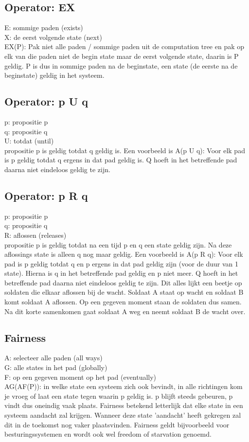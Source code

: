\documentclass{article}
\begin{document}
\subsection{Operator: EX}
E: sommige paden (exists)\\
X: de eerst volgende state (next)\\
EX(P): Pak niet alle paden / sommige paden uit de computation tree en pak op elk van die paden niet de begin state maar de eerst volgende state, daarin is P geldig. P is dus in sommige paden na de beginstate, een state (de eerste na de beginstate) geldig in het systeem.

\subsection{Operator: p U q}
p: propositie p\\
q: propositie q\\
U: totdat (until)\\
propositie p is geldig totdat q geldig is. Een voorbeeld is A(p U q): Voor elk pad is p geldig totdat q ergens in dat pad geldig is. Q hoeft in het betreffende pad daarna niet eindeloos geldig te zijn.

\subsection{Operator: p R q}
p: propositie p\\
q: propositie q\\
R: aflossen (releases)\\
propositie p is geldig totdat na een tijd p en q een state geldig zijn. Na deze aflossings state is alleen q nog maar geldig. Een voorbeeld is A(p R q): Voor elk pad is p geldig totdat q en p ergens in dat pad geldig zijn (voor de duur van 1 state). Hierna is q in het betreffende pad geldig en p niet meer. Q hoeft in het betreffende pad daarna niet eindeloos geldig te zijn. Dit alles lijkt een beetje op soldaten die elkaar aflossen bij de wacht. Soldaat A staat op wacht en soldaat B komt soldaat A aflossen. Op een gegeven moment staan de soldaten dus samen. Na dit korte samenkomen gaat soldaat A weg en neemt soldaat B de wacht over.

\subsection{Fairness}
A: selecteer alle paden (all ways)\\
G: alle states in het pad (globally)\\ 
F: op een gegeven moment op het pad (eventually)\\
AG(AF(P)): in welke state een systeem zich ook bevindt, in alle richtingen kom je vroeg of laat een state tegen waarin p geldig is. p blijft steeds gebeuren, p vindt dus oneindig vaak plaats. Fairness betekend letterlijk dat elke state in een systeem aandacht zal krijgen. Wanneer deze state 'aandacht' heeft gekregen zal dit in de toekomst nog vaker plaatsvinden. Fairness geldt bijvoorbeeld voor besturingssystemen en wordt ook wel freedom of starvation genoemd.
\end{document}
